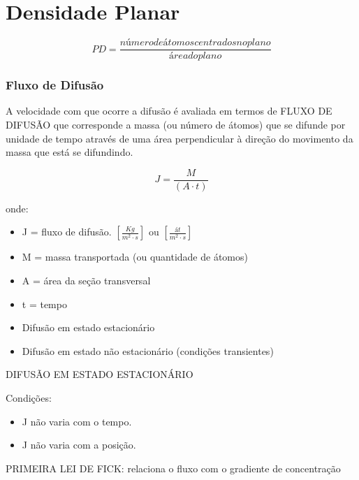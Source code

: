\section{Densidade Planar}

\begin{equation}\label{key}
PD = \dfrac{número de átomos centrados no plano}{área do plano}
\end{equation}


\subsubsection{Fluxo de Difusão}

A velocidade com que ocorre a difusão é avaliada em termos de FLUXO DE DIFUSÃO que corresponde a massa (ou número de átomos) que se difunde por unidade de tempo através de uma área perpendicular à direção do movimento da massa que está se difundindo.

\begin{equation}\label{key}
J = \frac{M}{(A \cdot t)}
\end{equation}

onde: 

\begin{itemize}
	\item J = fluxo de difusão. $[\frac{Kg}{m^{2} \cdot s}]$ ou $[\frac{át}{m^{2} \cdot s}]$
	\item M = massa transportada (ou quantidade de átomos)
	\item A = área da seção transversal
	\item t = tempo
\end{itemize}


\begin{itemize}
	\item Difusão em estado estacionário
	\item Difusão em estado não estacionário (condições transientes)
\end{itemize}

DIFUSÃO EM ESTADO ESTACIONÁRIO

Condições:

\begin{itemize}
	\item J não varia com o tempo.
	\item J não varia com a posição.
\end{itemize}

PRIMEIRA LEI DE FICK: relaciona o fluxo com o gradiente de concentração

